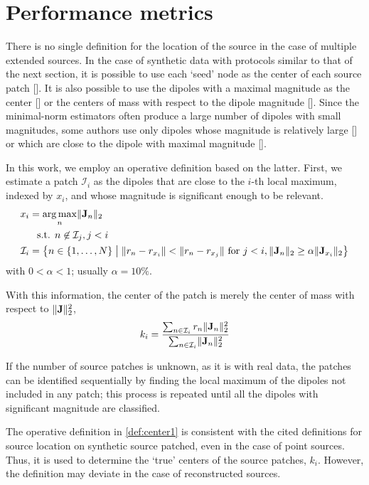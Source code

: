 \section{Performance metrics}

There is no single definition for the location of the source in the case of multiple extended sources.
%
In the case of synthetic data with protocols similar to that of the next section, it is possible to use each `seed' node as the center of each source patch [].
%
It is also possible to use the dipoles with a maximal magnitude as the center [] or the centers of mass with respect to the dipole magnitude [].
%
Since the minimal-norm estimators often produce a large number of dipoles with small magnitudes, some authors use only dipoles whose magnitude is relatively large [] or which are close to the dipole with maximal magnitude [].

In this work, we employ an operative definition based on the latter.
%
First, we estimate a patch $\mathcal{I}_i$ as the dipoles that are close to the $i$-th local maximum, indexed by $x_i$, and whose magnitude is significant enough to be relevant.
\begin{align}
x_i &= \operatorname*{arg\,max}_{n} \lVert \mathbf{J}_n \rVert_2
\nonumber \\
&\phantom{=} \text{s.t. }
n\not\in \mathcal{I}_j, j<i
\\
\mathcal{I}_i
&=
\left\{  n\in \left\{ 1, \dots, N \right\} \;\middle|\; 
\lVert r_n - r_{x_i} \rVert < \lVert r_n - r_{x_j} \rVert \text{ for } j<i,
\lVert \mathbf{J}_n \rVert_2\geq \alpha\lVert \mathbf{J}_{x_i} \rVert_2  \right\}
\end{align}
with $0<\alpha<1$; usually $\alpha=10\%$.

With this information, the center of the patch is merely the center of mass with respect to $\lVert \mathbf{J} \rVert_2^2$,
\begin{align}
k_i = 
\frac{\sum_{n\in \mathcal{I}_i} r_n \lVert \mathbf{J}_n \rVert_2^2 }{\sum_{n\in \mathcal{I}_i} \lVert \mathbf{J}_n \rVert_2^2}
\label{def:center1}
\end{align}

If the number of source patches is unknown, as it is with real data, the patches can be identified sequentially by finding the local maximum of the dipoles not included in any patch; this process is repeated until all the dipoles with significant magnitude are classified.

The operative definition in \eqref{def:center1} is consistent with the cited definitions for source location on synthetic source patched, even in the case of point sources.
%
Thus, it is used to determine the `true' centers of the source patches, $k_i$.
%
However, the definition may deviate in the case of reconstructed sources.


